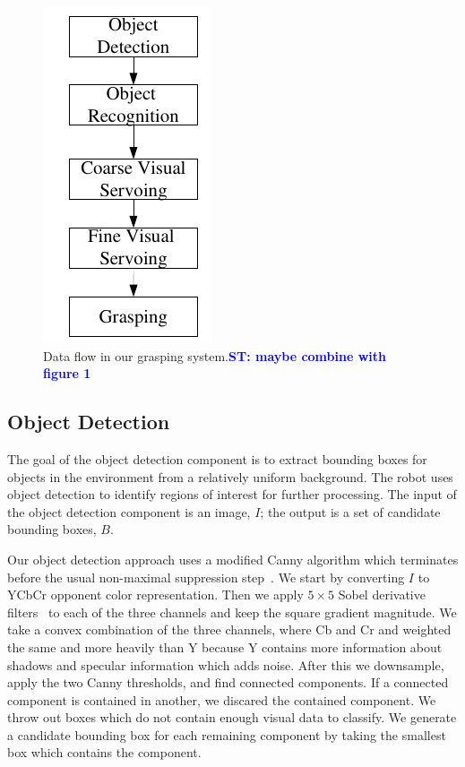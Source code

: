 \documentclass[graybox]{svmult}
\newcommand{\stnote}[1]{\textcolor{blue}{\textbf{ST: #1}}}
\begin{document}
\begin{figure}
\centering
\includegraphics{figures/system.pdf}
\caption{Data flow in our grasping system.\label{fig:system}\stnote{maybe combine with figure 1}}
\end{figure}

\subsection{Object Detection}
\label{sec:detection}

The goal of the object detection component is to extract bounding
boxes for objects in the environment from a relatively uniform
background.  The robot uses object detection to identify regions of
interest for further processing.  The input of the object detection
component is an image, $I$; the output is a set of candidate bounding
boxes, $B$.  

Our object detection approach uses a modified Canny algorithm which
terminates before the usual non-maximal suppression
step~\citep{canny86}.  We start by converting $I$ to YCbCr opponent
color representation.  Then we apply $5 \times 5$ Sobel derivative
filters~\citep{sobel95} to each of the three channels and keep the
square gradient magnitude. We take a convex combination of the three
channels, where Cb and Cr and weighted the same and more heavily than
Y because Y contains more information about shadows and specular
information which adds noise.  After this we downsample, apply the two
Canny thresholds, and find connected components.  If a connected
component is contained in another, we discared the contained
component.  We throw out boxes which do not contain enough visual data
to classify.  We generate a candidate bounding box for each remaining
component by taking the smallest box which contains the component.
\end{document}

